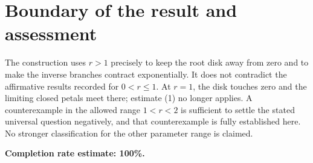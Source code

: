 \documentclass[11pt]{article}
\begin{document}
\section*{Boundary of the result and assessment}
The construction uses $r>1$ precisely to keep the root disk away from zero and to make the inverse branches contract exponentially. It does not contradict the affirmative results recorded for $0<r\le1$. At $r=1$, the disk touches zero and the limiting closed petals meet there; estimate (1) no longer applies. A counterexample in the allowed range $1<r<2$ is sufficient to settle the stated universal question negatively, and that counterexample is fully established here. No stronger classification for the other parameter range is claimed.

\textbf{Completion rate estimate: 100\%.}
\end{document}
